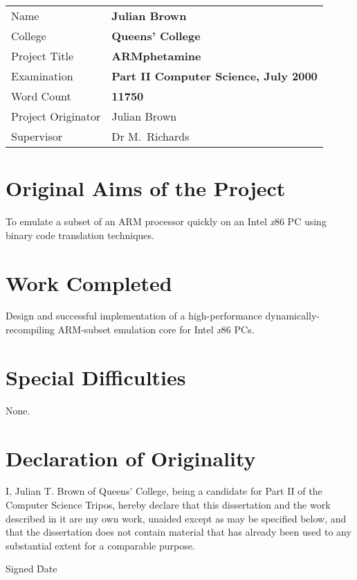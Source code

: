 
{\large
\begin{tabular}{@{}l@{ : }l}
Name			& \bf Julian Brown			\\
College			& \bf Queens' College			\\
Project Title		& \bf ARMphetamine	\\
Examination		& \bf Part II Computer Science, July 2000	\\
Word Count		& \bf 11750			\\
Project Originator	& Julian Brown			\\
Supervisor		& Dr M.\ Richards			\\
\end{tabular}
}


\section*{Original Aims of the Project}

To emulate a subset of an ARM processor quickly on an Intel {\it x}86 PC using binary code translation techniques.

\section*{Work Completed}

Design and successful implementation of a high-performance dynamically-recompiling ARM-subset emulation core for Intel {\it x}86 PCs.

\section*{Special Difficulties}

None.

\section*{Declaration of Originality}

I, Julian T. Brown of Queens' College, being a candidate for Part II of the Computer Science Tripos, hereby declare that this dissertation and the work described in it are my own work, unaided except as may be specified below, and that the dissertation does not contain material that has already been used to any substantial extent for a comparable purpose.

\begin{tabbing}
Signed \hspace{85mm}\= Date
\end{tabbing}
